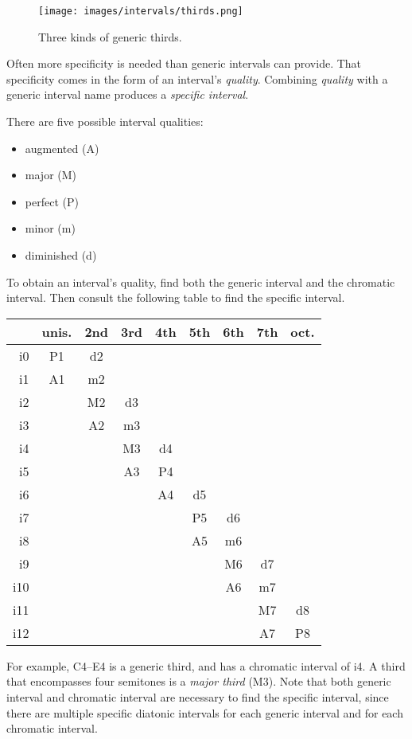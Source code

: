 \documentclass{book}
\providecommand{\tightlist}{%
  \setlength{\itemsep}{0pt}\setlength{\parskip}{0pt}}
\begin{document}
\begin{figure}
\centering
\texttt{[image: images/intervals/thirds.png]}
\caption{Three kinds of generic thirds.}
\end{figure}

Often more specificity is needed than generic intervals can provide. That
specificity comes in the form of an interval's \emph{quality}. Combining
\emph{quality} with a generic interval name produces a \emph{specific
interval}.

There are five possible interval qualities:

\begin{itemize}
\tightlist
\item
  augmented (A)
\item
  major (M)
\item
  perfect (P)
\item
  minor (m)
\item
  diminished (d)
\end{itemize}

To obtain an interval's quality, find both the generic interval and the
chromatic interval. Then consult the following table to find the specific
interval.

\begin{longtable}[]{@{}rcccccccc@{}}
\toprule
& unis. & 2nd & 3rd & 4th & 5th & 6th & 7th & oct. \\
\midrule
\endhead
i0 & P1 & d2 & & & & & & \\
i1 & A1 & m2 & & & & & & \\
i2 & & M2 & d3 & & & & & \\
i3 & & A2 & m3 & & & & & \\
i4 & & & M3 & d4 & & & & \\
i5 & & & A3 & P4 & & & & \\
i6 & & & & A4 & d5 & & & \\
i7 & & & & & P5 & d6 & & \\
i8 & & & & & A5 & m6 & & \\
i9 & & & & & & M6 & d7 & \\
i10 & & & & & & A6 & m7 & \\
i11 & & & & & & & M7 & d8 \\
i12 & & & & & & & A7 & P8 \\
\bottomrule
\end{longtable}

For example, C4--E4 is a generic third, and has a chromatic interval of i4. A
third that encompasses four semitones is a \emph{major third} (M3). Note that
both generic interval and chromatic interval are necessary to find the
specific interval, since there are multiple specific diatonic intervals for
each generic interval and for each chromatic interval.
\end{document}
